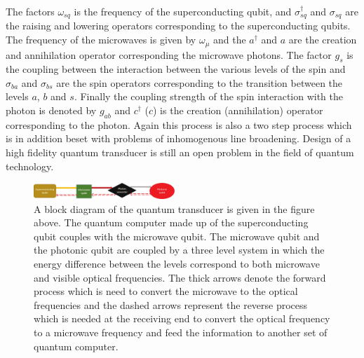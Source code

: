 \documentclass[twocolumn, aps, rmp, amsmath, amssymb, nofootinbib, superscriptaddress, longbibliography, floatfix, table-of-contents, eqsecnum]{revtex4-1}
\begin{document}
The factors $\omega_{sq}$ is the frequency of the superconducting qubit, and $\sigma_{sq}^{\dag}$ and $\sigma_{sq}$ are the raising and lowering operators corresponding to the superconducting qubits. The frequency of the microwaves is given by $\omega_{\mu}$ and the $a^{\dag}$ and $a$ are the creation and annihilation operator corresponding the microwave photons. The factor $g_{s}$ is the coupling between the interaction between the various levels of the spin and $\sigma_{ba}$ and $\sigma_{bs}$ are the spin operators corresponding to the transition between the levels $a$, $b$ and $s$. Finally the coupling strength of the spin interaction with the photon is denoted by $g_{ab}$ and $c^{\dag}$ ($c$) is the creation (annihilation) operator corresponding to the photon. Again this process is also a two step process which is in addition beset with problems of inhomogenous line broadening. Design of a high fidelity quantum transducer is still an open problem in the field of quantum technology. 

\begin{figure}[!htbp]
\includegraphics[width=0.475\textwidth]{quantum_transducer}
\caption{A block diagram of the quantum transducer is given in the figure above. The quantum computer made up of the superconducting qubit couples with the microwave qubit. The microwave qubit and the photonic qubit are coupled by a three level system in which the energy difference between the levels correspond to both microwave and visible optical frequencies. The thick arrows denote the forward process which is need to convert the microwave to the optical frequencies and the dashed arrows represent the reverse process which is needed at the receiving end to convert the optical frequency to a microwave frequency and feed the information to another set of quantum computer.}\label{fig:quantum_transducer}
\end{figure}
\end{document}
